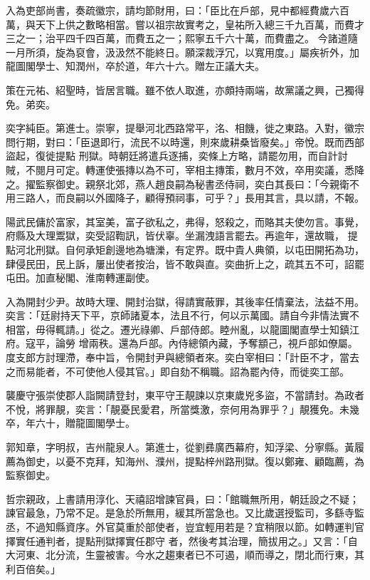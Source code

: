 \begin{pinyinscope}
 入為吏部尚書，奏疏徽宗，請均節財用，曰：「臣比在戶部，見中都經費歲六百萬，與天下上供之數略相當。嘗以祖宗故實考之，皇祐所入總三千九百萬，而費才三之一；治平四千四百萬，而費五之一；熙寧五千六十萬，而費盡之。
 今諸道隨一月所須，旋為裒會，汲汲然不能終日。願深裁浮冗，以寬用度。」屬疾祈外，加龍圖閣學士、知潤州，卒於道，年六十六。贈左正議大夫。



 策在元祐、紹聖時，皆居言職。雖不依人取進，亦頗持兩端，故黨議之興，己獨得免。弟奕。



 奕字純臣。第進士。崇寧，提舉河北西路常平，洺、相饑，徙之東路。入對，徽宗問行期，對曰：「臣退即行，流民不以時還，則來歲耕桑皆廢矣。」帝悅。既而西部盜起，復徙提點
 刑獄。時朝廷將遣兵逐捕，奕條上方略，請罷勿用，而自計討賊，不閱月可定。轉運使張摶以為不可，宰相主摶策，數月不效，卒用奕議，悉降之。擢監察御史。親祭北郊，燕人趙良嗣為秘書丞侍祠，奕白其長曰：「今親衛不用三路人，而良嗣以外國降子，顧得預祠事，可乎？」長用其言，具以請，不報。



 陽武民傭於富家，其室美，富子欲私之，弗得，怒殺之，而賂其夫使勿言。事覺，府縣及大理鬻獄，奕受詔鞫訊，皆伏辜。坐漏洩語言罷去。再逾年，還故職，
 提點河北刑獄。自何承矩創邊地為塘濼，有定界。既中貴人典領，以屯田開拓為功，肆侵民田，民上訴，屢出使者按治，皆不敢與直。奕曲折上之，疏其五不可，詔罷屯田。加直秘閣、淮南轉運副使。



 入為開封少尹。故時大理、開封治獄，得請實蔽罪，其後率任情棄法，法益不用。奕言：「廷尉持天下平，京師諸夏本，法且不行，何以示萬國。請自今非情法實不相當，毋得輒請。」從之。遷光祿卿、戶部侍郎。睦州亂，以龍圖閣直學士知鎮江府。寇平，論勞
 增兩秩。還為戶部。內侍總領內藏，予奪顓己，視戶部如僚屬。度支郎方討理滯，奉中旨，令開封尹與總領者來。奕白宰相曰：「計臣不才，當去之而易能者，不可使他人侵其官。」即自劾不稱職。詔為罷內侍，而徙奕工部。



 襲慶守張崇使郡人詣闕請登封，東平守王靚諫以京東歲兇多盜，不當請封。為政者不悅，將罪靚，奕言：「靚憂民愛君，所當獎激，奈何用為罪乎？」靚獲免。未幾卒，年六十，贈龍圖閣學士。



 郭知章，字明叔，吉州龍泉人。第進士，從劉彞廣西幕府，知浮梁、分寧縣。黃履薦為御史，以憂不克拜，知海州、濮州，提點梓州路刑獄。復以鄭雍、顧臨薦，為監察御史。



 哲宗親政，上書請用淳化、天禧詔增諫官員，曰：「館職無所用，朝廷設之不疑；諫官最急，乃常不足。是急於所無用，緩其所當急也。又比歲選授監司，多繇寺監丞，不過知縣資序。外官莫重於部使者，豈宜輕用若是？宜稍限以節。如轉運判官擇實任通判者，提點刑獄擇實任郡守
 者，然後考其治理，簡拔用之。」又言：「自大河東、北分流，生靈被害。今水之趨東者已不可遏，順而導之，閉北而行東，其利百倍矣。」




\end{pinyinscope}
